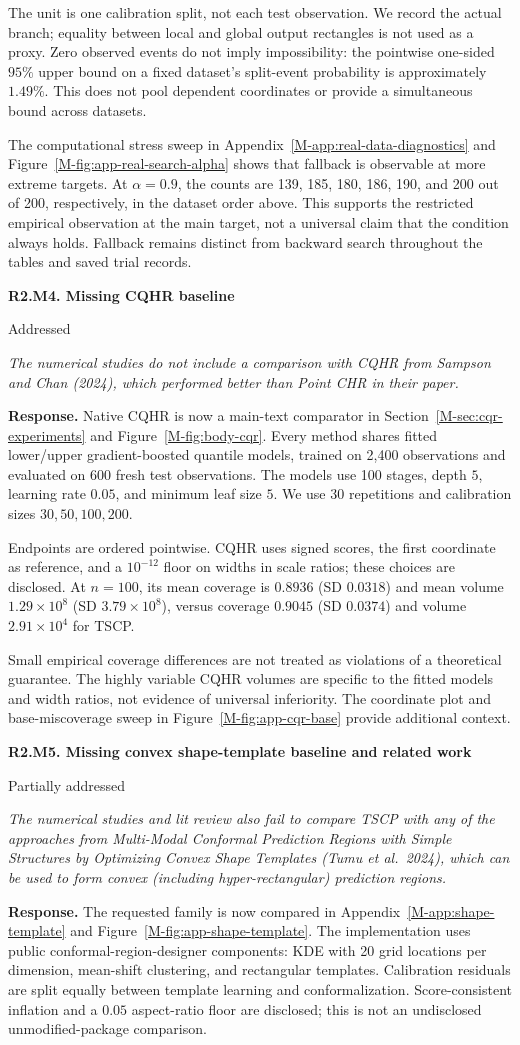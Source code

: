 \documentclass[11pt]{article}
\newcommand{\mssec}[1]{Section~\ref*{M-#1}}
\newcommand{\msapp}[1]{Appendix~\ref*{M-#1}}
\newcommand{\msfig}[1]{Figure~\ref*{M-#1}}
\newcommand{\point}[3]{\par\Needspace{7\baselineskip}\medskip
\noindent\parbox[t]{0.77\linewidth}{\textbf{#1}}\hfill
\parbox[t]{0.21\linewidth}{\raggedleft\small\sffamily #2}\par\nopagebreak
{\color{ReviewerBlue}\small\itshape #3\par}\textbf{Response.} }
\begin{document}
The unit is one calibration split, not each test observation. We record the actual branch; equality between local and global output rectangles is not used as a proxy. Zero observed events do not imply impossibility: the pointwise one-sided $95\%$ upper bound on a fixed dataset's split-event probability is approximately $1.49\%$. This does not pool dependent coordinates or provide a simultaneous bound across datasets.

The computational stress sweep in \msapp{app:real-data-diagnostics} and \msfig{fig:app-real-search-alpha} shows that fallback is observable at more extreme targets. At $\alpha=0.9$, the counts are 139, 185, 180, 186, 190, and 200 out of 200, respectively, in the dataset order above. This supports the restricted empirical observation at the main target, not a universal claim that the condition always holds. Fallback remains distinct from backward search throughout the tables and saved trial records.

\point{R2.M4. Missing CQHR baseline}{Addressed}{The numerical studies do not include a comparison with CQHR from
Sampson and Chan (2024), which performed better than Point CHR in
their paper.}
\label{response:R2.M4}
Native CQHR is now a main-text comparator in \mssec{sec:cqr-experiments} and \msfig{fig:body-cqr}. Every method shares fitted lower/upper gradient-boosted quantile models, trained on 2,400 observations and evaluated on 600 fresh test observations. The models use 100 stages, depth $5$, learning rate $0.05$, and minimum leaf size $5$. We use 30 repetitions and calibration sizes $30,50,100,200$.

Endpoints are ordered pointwise. CQHR uses signed scores, the first coordinate as reference, and a $10^{-12}$ floor on widths in scale ratios; these choices are disclosed. At $n=100$, its mean coverage is $0.8936$ (SD $0.0318$) and mean volume $1.29\times10^8$ (SD $3.79\times10^8$), versus coverage $0.9045$ (SD $0.0374$) and volume $2.91\times10^4$ for TSCP.

Small empirical coverage differences are not treated as violations of a theoretical guarantee. The highly variable CQHR volumes are specific to the fitted models and width ratios, not evidence of universal inferiority. The coordinate plot and base-miscoverage sweep in \msfig{fig:app-cqr-base} provide additional context.

\point{R2.M5. Missing convex shape-template baseline and related work}{Partially addressed}{The numerical studies and lit review also fail to compare TSCP with
any of the approaches from Multi-Modal Conformal Prediction Regions
with Simple Structures by Optimizing Convex Shape Templates
(Tumu et al.\ 2024), which can be used to form convex (including
hyper-rectangular) prediction regions.}
\label{response:R2.M5}
The requested family is now compared in \msapp{app:shape-template} and \msfig{fig:app-shape-template}. The implementation uses public conformal-region-designer components: KDE with 20 grid locations per dimension, mean-shift clustering, and rectangular templates. Calibration residuals are split equally between template learning and conformalization. Score-consistent inflation and a $0.05$ aspect-ratio floor are disclosed; this is not an undisclosed unmodified-package comparison.
\end{document}
